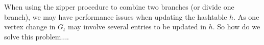 When using the zipper procedure to combine two branches (or divide one branch), we may have performance issues when updating the hashtable $h$. As one vertex change in $G_t$ may involve several entries to be updated in $h$. So how do we solve this problem....



